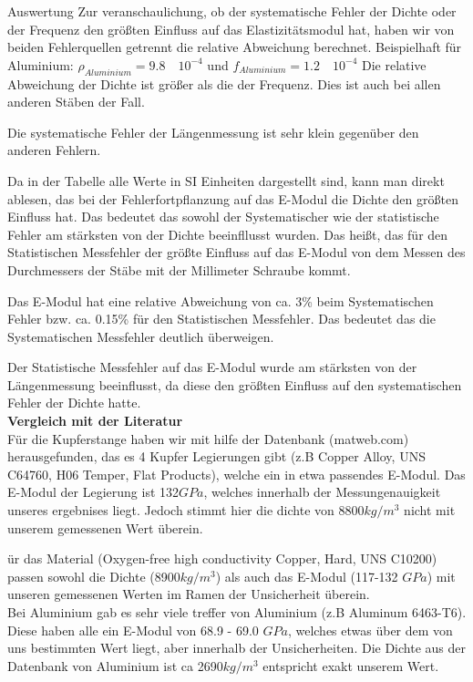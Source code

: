 \documentclass[twoside]{protokoll}
\begin{document}
\begin{aufgabe}{Auswertung}
Zur veranschaulichung, ob der systematische Fehler der Dichte oder der Frequenz den größten Einfluss auf das Elastizitätsmodul hat, haben wir von beiden Fehlerquellen getrennt die relative Abweichung berechnet.
Beispielhaft für Aluminium:
$ \rho_{Aluminium} = 9.8 \quad 10^{-4} $ und $ f_{Aluminium} = 1.2 \quad 10^{-4} $
Die relative Abweichung der Dichte ist größer als die der Frequenz. Dies ist auch bei allen anderen Stäben der Fall.

Die systematische Fehler der Längenmessung ist sehr klein gegenüber den anderen Fehlern.

Da in der Tabelle alle Werte in SI Einheiten dargestellt sind, kann man direkt ablesen,
das bei der Fehlerfortpflanzung auf das E-Modul die Dichte den größten Einfluss hat. 
Das bedeutet das sowohl der Systematischer wie der statistische Fehler am stärksten von der Dichte beeinfllusst wurden.
Das heißt, das für den Statistischen Messfehler der größte Einfluss auf das E-Modul von dem Messen des Durchmessers der Stäbe mit der Millimeter Schraube kommt.
 
Das E-Modul hat eine relative Abweichung von ca. 3\% beim Systematischen Fehler bzw. ca. 0.15\% für den Statistischen Messfehler.
Das bedeutet das die Systematischen Messfehler deutlich überweigen.
 
Der Statistische Messfehler auf das E-Modul wurde am stärksten von der Längenmessung beeinflusst, da diese den größten Einfluss auf den systematischen Fehler der Dichte hatte. \\
 
\textbf{Vergleich mit der Literatur} \\
Für die Kupferstange haben wir mit hilfe der Datenbank (matweb.com) herausgefunden, das es 4 Kupfer Legierungen gibt (z.B Copper Alloy, UNS C64760, H06 Temper, Flat Products), welche ein in etwa passendes E-Modul.
Das E-Modul der Legierung ist 132$GPa$, welches innerhalb der Messungenauigkeit unseres ergebnises liegt.
Jedoch stimmt hier die dichte von 8800$kg/m^3$ nicht mit unserem gemessenen Wert überein.
 
ür das Material (Oxygen-free high conductivity Copper, Hard, UNS C10200) passen sowohl die Dichte (8900$kg/m^3$) als auch das E-Modul (117-132 $GPa$) mit unseren gemessenen Werten im Ramen der Unsicherheit überein. \\
 
Bei Aluminium gab es sehr viele treffer von Aluminium (z.B Aluminum 6463-T6).
Diese haben alle ein E-Modul von 68.9 - 69.0 $GPa$, welches etwas über dem von uns bestimmten Wert liegt, aber innerhalb der Unsicherheiten.
Die Dichte aus der Datenbank von Aluminium ist ca 2690$kg/m^3$ entspricht exakt unserem Wert. \\
 

\end{aufgabe}
\end{document}
